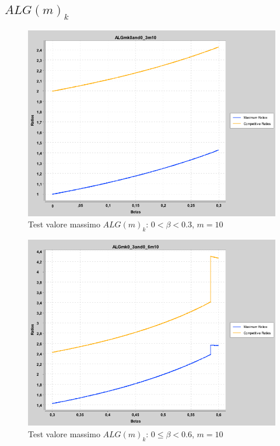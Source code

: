 \documentclass[12pt]{article}
\begin{document}
\subsection{$ALG(m)_{k}$}
\setcounter{figure}{0} 
\renewcommand{\thefigure}{\thesubsection.\arabic{figure}}
\begin{figure}[H]
\caption{Test valore massimo $ALG(m)_{k}$: $0 < \beta < 0.3$, $m = 10$}
\centering
\includegraphics[scale=0.4]{max/ALGmk0and0_3m10.png}
\end{figure}
\begin{figure}[H]
\caption{Test valore massimo $ALG(m)_{k}$: $0 \leq \beta < 0.6$, $m = 10$}
\centering
\includegraphics[scale=0.4]{max/ALGmk0_3and0_6m10.png}
\end{figure}
\end{document}
